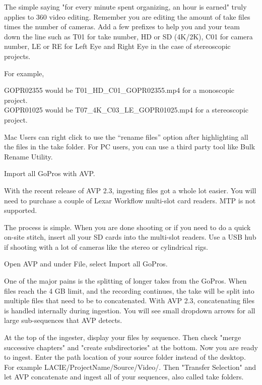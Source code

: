 \begin{fullwidth}
The simple saying "for every minute spent organizing, an hour is earned" truly applies to 360 video editing. Remember you are editing the amount of take files times the number of cameras. Add a few prefixes to help you and your team down the line such as T01 for take number, HD or SD (4K/2K), C01 for camera number, LE or RE for Left Eye and Right Eye in the case of stereoscopic projects.

For example,

GOPR02355 would be T01\_HD\_C01\_GOPR02355.mp4 for a monoscopic project.
\\
GOPR01025 would be T07\_4K\_C03\_LE\_GOPR01025.mp4 for a stereoscopic project.

\tip Mac Users can right click to use the “rename files” option after highlighting all the files in the take folder. For PC users, you can use a third party tool like Bulk Rename Utility.

{\large Import all GoPros with AVP. \par}

With the recent release of AVP 2.3, ingesting files got a whole lot easier. You will need to purchase a couple of Lexar Workflow multi-slot card readers. MTP is not supported.

The process is simple. When you are done shooting or if you need to do a quick on-site stitch, insert all your SD cards into the multi-slot readers. Use a USB hub if shooting with a lot of cameras like the stereo or cylindrical rigs.

Open AVP and under File, select Import all GoPros.


One of the major pains is the splitting of longer takes from the GoPros. When files reach the 4 GB limit, and the recording continues, the take will be split into multiple files that need to be to concatenated. With AVP 2.3, concatenating files is handled internally during ingestion. You will see small dropdown arrows for all large sub-sequences that AVP detects.


At the top of the ingester, display your files by sequence. Then check "merge successive chapters" and "create subdirectories" at the bottom. Now you are ready to ingest. Enter the path location of your source folder instead of the desktop. For example LACIE/ProjectName/Source/Video/. Then "Transfer Selection" and let AVP concatenate and ingest all of your sequences, also called take folders.


\end{fullwidth}
